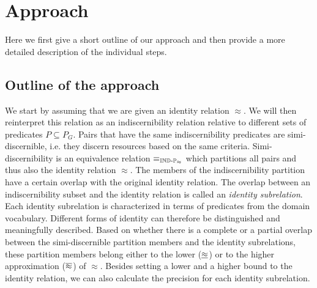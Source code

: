 \section{Approach}
\label{sec:approach}

Here we first give a short outline of our approach and then
  provide a more detailed description of the individual steps.

\subsection{Outline of the approach}

We start by assuming that we are given an identity relation $\approx$.
We will then reinterpret this relation as an indiscernibility relation
  relative to different sets of predicates $P \subseteq P_G$.
Pairs that have the same indiscernibility predicates
  are simi-discernible, i.e. they discern resources
  based on the same criteria.
Simi-discernibility is an equivalence relation $\equiv_{\operatorname{{\mathbb{IND}-\mathbb{P}}}_{\approx}}$
  which partitions all pairs and thus also the identity relation $\approx$.
The members of the indiscernibility partition
  have a certain overlap with the original identity relation.
The overlap between an indiscernibility subset and the identity relation
  is called an \emph{identity subrelation}.
Each identity subrelation is characterized in terms of predicates
  from the domain vocabulary.
Different forms of identity can therefore be distinguished
  and meaningfully described.
Based on whether there is a complete or a partial overlap
  between the simi-discernible partition members and
  the identity subrelations,
  these partition members belong either to the lower ($\underline{\approx}$)
  or to the higher approximation ($\overline{\approx}$) of $\approx$.
Besides setting a lower and a higher bound to the identity relation,
  we can also calculate the precision for each identity subrelation.





